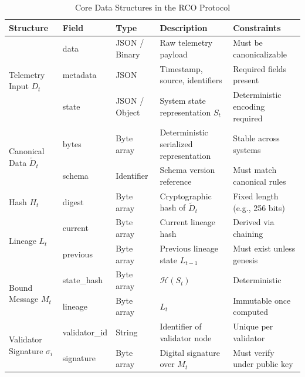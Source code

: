 \begin{table}[htbp]
\footnotesize
\centering
\caption{Core Data Structures in the RCO Protocol}
\label{tab:data-structures}

\renewcommand{\arraystretch}{1.25}

\begin{tabularx}{\textwidth}{|p{3cm}|p{3cm}|X|X|X|}
\hline
\textbf{Structure} & \textbf{Field} & \textbf{Type} & \textbf{Description} & \textbf{Constraints} \\
\hline

\multirow{3}{*}{Telemetry Input $D_t$}
 & data & JSON / Binary & Raw telemetry payload & Must be canonicalizable \\
 & metadata & JSON & Timestamp, source, identifiers & Required fields present \\
 & state & JSON / Object & System state representation $S_t$ & Deterministic encoding required \\

\hline

\multirow{2}{*}{Canonical Data $\tilde{D}_t$}
 & bytes & Byte array & Deterministic serialized representation & Stable across systems \\
 & schema & Identifier & Schema version reference & Must match canonical rules \\

\hline

\multirow{1}{*}{Hash $H_t$}
 & digest & Byte array & Cryptographic hash of $\tilde{D}_t$ & Fixed length (e.g., 256 bits) \\

\hline

\multirow{2}{*}{Lineage $L_t$}
 & current & Byte array & Current lineage hash & Derived via chaining \\
 & previous & Byte array & Previous lineage state $L_{t-1}$ & Must exist unless genesis \\

\hline

\multirow{2}{*}{Bound Message $M_t$}
 & state\_hash & Byte array & $\mathcal{H}(S_t)$ & Deterministic \\
 & lineage & Byte array & $L_t$ & Immutable once computed \\

\hline

\multirow{2}{*}{Validator Signature $\sigma_i$}
 & validator\_id & String & Identifier of validator node & Unique per validator \\
 & signature & Byte array & Digital signature over $M_t$ & Must verify under public key \\


\end{tabularx}
\end{table}
